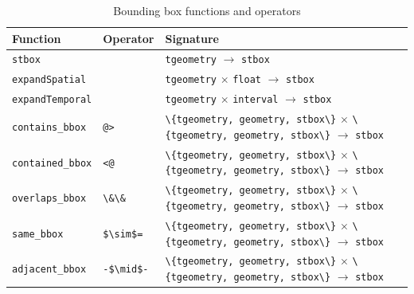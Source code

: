 \begin{table}[htb]
    \centering
    \begin{tabularx}{\textwidth}{|l|l|X|}
    \hline
    \textbf{Function}   & \textbf{Operator} & \textbf{Signature} \\ 
    \hline
    \lstinline+stbox+               & & \lstinline+tgeometry+ $\rightarrow$ \lstinline+stbox+\\
    \hline
    \lstinline+expandSpatial+       & & \lstinline+tgeometry+ $\times$ \lstinline+float+ $\rightarrow$ \lstinline+stbox+\\
    \hline
    \lstinline+expandTemporal+      & & \lstinline+tgeometry+ $\times$ \lstinline+interval+ $\rightarrow$ \lstinline+stbox+ \\
    \hline
    \lstinline+contains_bbox+      & \lstinline+@>+ & \lstinline+\{tgeometry, geometry, stbox\}+ $\times$ \lstinline+\{tgeometry, geometry, stbox\}+ $\rightarrow$ \lstinline+stbox+ \\
    \hline
    \lstinline+contained_bbox+     & \lstinline+<@+ & \lstinline+\{tgeometry, geometry, stbox\}+ $\times$ \lstinline+\{tgeometry, geometry, stbox\}+ $\rightarrow$ \lstinline+stbox+ \\
    \hline
    \lstinline+overlaps_bbox+      & \lstinline+\&\&+ & \lstinline+\{tgeometry, geometry, stbox\}+ $\times$ \lstinline+\{tgeometry, geometry, stbox\}+ $\rightarrow$ \lstinline+stbox+ \\
    \hline
    \lstinline+same_bbox+          & \lstinline+$\sim$=+ & \lstinline+\{tgeometry, geometry, stbox\}+ $\times$ \lstinline+\{tgeometry, geometry, stbox\}+ $\rightarrow$ \lstinline+stbox+ \\
    \hline
    \lstinline+adjacent_bbox+      & \lstinline+-$\mid$-+ & \lstinline+\{tgeometry, geometry, stbox\}+ $\times$ \lstinline+\{tgeometry, geometry, stbox\}+ $\rightarrow$ \lstinline+stbox+ \\
    \hline
    \end{tabularx}
    \caption{Bounding box functions and operators}
    \label{table:bbox_funcs}
\end{table}
